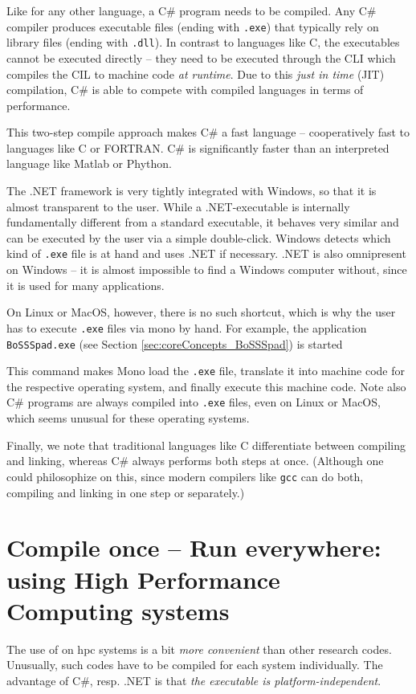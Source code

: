 \documentclass[a4paper,10pt]{report} %
\begin{document}
Like for any other language, a C\# program needs to be compiled. Any C\# compiler produces executable 
files (ending with \texttt{.exe}) that typically rely on library files (ending with \texttt{.dll}). 
In contrast to languages like C, the executables cannot be executed directly -- they need to be executed
 through the CLI which compiles the CIL to machine code \emph{at runtime}. Due to this \emph{just in time} (JIT) 
compilation, C\# is able to compete with compiled languages in terms of performance.

This two-step compile approach makes C\# a fast language -- cooperatively fast to 
languages like C or FORTRAN. C\# is significantly faster than an interpreted language like 
Matlab or Phython. 

The .NET framework is very tightly integrated with Windows, so that it is almost transparent to the user. 
While a .NET-executable is internally fundamentally different from a standard executable, it behaves very similar 
and can be executed by the user via a simple double-click. Windows detects which kind of \texttt{.exe} file is 
at hand and uses .NET if necessary. .NET is also omnipresent on Windows -- it is almost impossible to find a 
Windows computer without,
since it is used for many applications.

On Linux or MacOS, however, there is no such shortcut, which is why the user has to execute \texttt{.exe} 
files via mono by hand. For example, the \BoSSSpad{} application \texttt{BoSSSpad.exe} 
(see Section \ref{sec:coreConcepts_BoSSSpad}) is started


This command makes Mono load the \texttt{.exe} file, translate it into machine code for the respective 
operating system, and finally execute this machine code.
Note also C\# programs are always compiled into {\tt .exe} files, even on Linux or MacOS,
which seems unusual for these operating systems. 

Finally, we note that traditional languages like C differentiate between compiling and linking, whereas 
C\# always performs both steps at once.
(Although one could philosophize on this, since 
modern compilers like {\tt gcc} can do both, compiling and linking
in one step or separately.)


\section{Compile once -- Run everywhere: using High Performance Computing systems}
\label{sec:HPCuse}
The use of \BoSSS{} on \ac{hpc} systems is a bit \emph{more convenient} than other 
research codes.
Unusually, such codes have to be compiled for each system individually. 
The advantage of C\#, resp. .NET is that \emph{the executable is platform-independent}.
\end{document}

